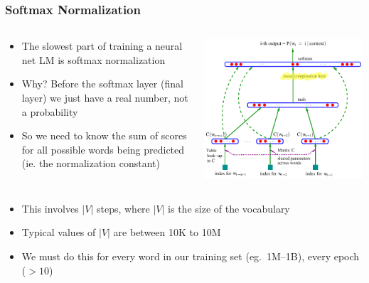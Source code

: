 \documentclass[xcolor=pdftex,x11names,table,hyperref]{beamer}
\begin{document}
\begin{frame}\frametitle{Softmax Normalization}

\begin{minipage}[0.8\textheight]{\textwidth}
\begin{columns}[T]
\begin{column}{0.6\textwidth}
\begin{itemize}
	\item The slowest part of training a neural net LM is softmax normalization
	\item Why?  Before the softmax layer (final layer) we just have a real number, not a probability
	\item So we need to know the sum of scores for all possible words being predicted (ie. the normalization constant)
\end{itemize}
\end{column}
\begin{column}{0.6\textwidth}
\includegraphics[width=1.0\textwidth]{images/bengio-etal2003_pg6_image_alt2.pdf}
\end{column}
\end{columns}
\end{minipage}

\pause

\hspace*{-2.5em}%
\begin{minipage}{1.0\textwidth}
\begin{itemize}
	\item This involves $|V|$ steps, where $|V|$ is the size of the vocabulary
	\item Typical values of $|V|$ are between 10K to 10M
	\item We must do this for every word in our training set (eg.\ 1M--1B), every epoch ($>10$)
\end{itemize}
\end{minipage}

\end{frame}
\end{document}
